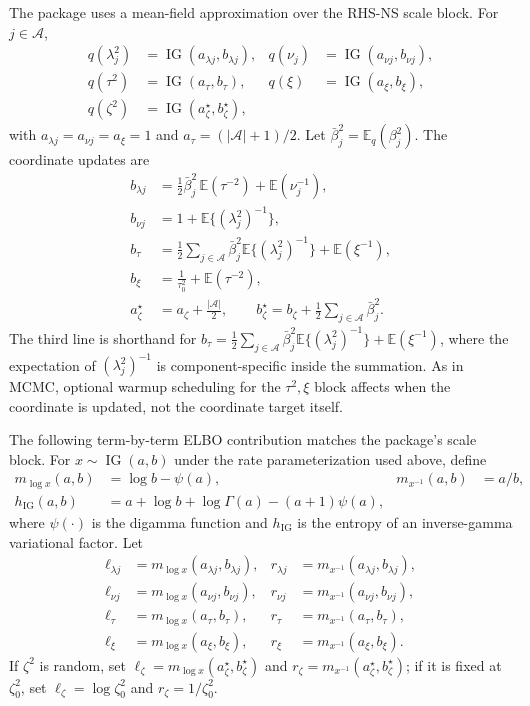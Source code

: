 \documentclass[nojss,noheadings]{jss}
\renewcommand{\E}{\mathbb{E}}
\newcommand{\IG}{\operatorname{IG}}
\begin{document}
The package uses a mean-field approximation over the RHS-NS scale block. For
$j\in\mathcal{A}$,
\begin{align}
q(\lambda_j^2)&=\IG(a_{\lambda j},b_{\lambda j}),&
q(\nu_j)&=\IG(a_{\nu j},b_{\nu j}),\\
q(\tau^2)&=\IG(a_\tau,b_\tau),&
q(\xi)&=\IG(a_\xi,b_\xi),\\
q(\zeta^2)&=\IG(a_\zeta^\star,b_\zeta^\star),
\end{align}
with $a_{\lambda j}=a_{\nu j}=a_\xi=1$ and
$a_\tau=(|\mathcal{A}|+1)/2$. Let
$\bar\beta_j^2=\E_q(\beta_j^2)$. The coordinate updates are
\begin{align}
b_{\lambda j}
&=\frac{1}{2}\bar\beta_j^2\,\E(\tau^{-2})+\E(\nu_j^{-1}),\\
b_{\nu j}
&=1+\E\{(\lambda_j^2)^{-1}\},\\
b_\tau
&=\frac{1}{2}\sum_{j\in\mathcal{A}}\bar\beta_j^2
\E\{(\lambda_j^2)^{-1}\}+\E(\xi^{-1}),\\
b_\xi
&=\frac{1}{\tau_0^2}+\E(\tau^{-2}),\\
a_\zeta^\star
&=a_\zeta+\frac{|\mathcal{A}|}{2},\qquad
b_\zeta^\star=b_\zeta+\frac{1}{2}\sum_{j\in\mathcal{A}}\bar\beta_j^2.
\label{eq:rhs_ns_vb_updates}
\end{align}
The third line is shorthand for
$b_\tau=\frac{1}{2}\sum_{j\in\mathcal{A}}\bar\beta_j^2
\E\{(\lambda_j^2)^{-1}\}+\E(\xi^{-1})$, where the expectation of
$(\lambda_j^2)^{-1}$ is component-specific inside the summation.
As in MCMC, optional warmup scheduling for the $\tau^2,\xi$ block affects when
the coordinate is updated, not the coordinate target itself.

The following term-by-term ELBO contribution matches the package's
 scale block. For $x\sim\IG(a,b)$ under the rate
parameterization used above, define
\begin{align}
m_{\log x}(a,b)&=\log b-\psi(a),&
m_{x^{-1}}(a,b)&=a/b,\\
h_{\IG}(a,b)&=a+\log b+\log\Gamma(a)-(a+1)\psi(a),
\end{align}
where $\psi(\cdot)$ is the digamma function and $h_{\IG}$ is the entropy of an
inverse-gamma variational factor. Let
\begin{align}
\ell_{\lambda j}&=m_{\log x}(a_{\lambda j},b_{\lambda j}),&
r_{\lambda j}&=m_{x^{-1}}(a_{\lambda j},b_{\lambda j}),\\
\ell_{\nu j}&=m_{\log x}(a_{\nu j},b_{\nu j}),&
r_{\nu j}&=m_{x^{-1}}(a_{\nu j},b_{\nu j}),\\
\ell_\tau&=m_{\log x}(a_\tau,b_\tau),&
r_\tau&=m_{x^{-1}}(a_\tau,b_\tau),\\
\ell_\xi&=m_{\log x}(a_\xi,b_\xi),&
r_\xi&=m_{x^{-1}}(a_\xi,b_\xi).
\end{align}
If $\zeta^2$ is random, set
$\ell_\zeta=m_{\log x}(a_\zeta^\star,b_\zeta^\star)$ and
$r_\zeta=m_{x^{-1}}(a_\zeta^\star,b_\zeta^\star)$; if it is fixed at
$\zeta_0^2$, set $\ell_\zeta=\log\zeta_0^2$ and
$r_\zeta=1/\zeta_0^2$.
\end{document}
